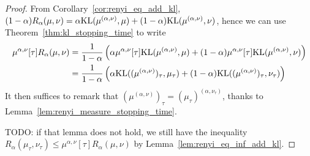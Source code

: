 \begin{proof}
From Corollary~\ref{cor:renyi_eq_add_kl}, $(1 - \alpha) R_\alpha(\mu, \nu) = \alpha \mathrm{KL}(\mu^{(\alpha, \nu)}, \mu) + (1 - \alpha)\mathrm{KL}(\mu^{(\alpha, \nu)}, \nu)$, hence we can use Theorem~\ref{thm:kl_stopping_time} to write
\begin{align*}
\mu^{\alpha, \nu}[\tau] R_\alpha(\mu, \nu)
&= \frac{1}{1 - \alpha}\left(\alpha \mu^{\alpha, \nu}[\tau]\mathrm{KL}(\mu^{(\alpha, \nu)}, \mu) + (1 - \alpha)\mu^{\alpha, \nu}[\tau]\mathrm{KL}(\mu^{(\alpha, \nu)}, \nu) \right)
\\
&= \frac{1}{1 - \alpha}\left(\alpha \mathrm{KL}((\mu^{(\alpha, \nu)})_\tau, \mu_\tau) + (1 - \alpha)\mathrm{KL}((\mu^{(\alpha, \nu)})_\tau, \nu_\tau) \right)
\end{align*}
It then suffices to remark that $(\mu^{(\alpha, \nu)})_\tau = (\mu_\tau)^{(\alpha, \nu_\tau)}$, thanks to Lemma~\ref{lem:renyi_measure_stopping_time}.

TODO: if that lemma does not hold, we still have the inequality $R_\alpha(\mu_\tau, \nu_\tau) \le \mu^{\alpha, \nu}[\tau] R_\alpha(\mu, \nu)$ by Lemma~\ref{lem:renyi_eq_inf_add_kl}.
\end{proof}